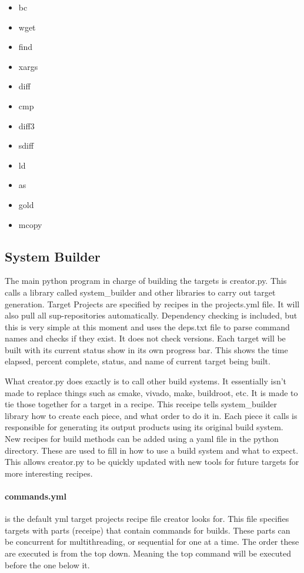 \begin{itemize}
\begin{itemize}
  \item bc
  \item wget
  \item find
  \item xargs
  \item diff
  \item cmp
  \item diff3
  \item sdiff
  \item ld
  \item as
  \item gold
  \item mcopy
  \end{itemize}
\end{itemize}

\subsection{System Builder}

\par
The main python program in charge of building the targets is creator.py. This calls a library called system\_builder and other libraries to carry out target generation.
Target Projects are specified by recipes in the projects.yml file. It will also pull all sup-repositories automatically. Dependency checking is included, but this is very simple at this moment
and uses the deps.txt file to parse command names and checks if they exist. It does not check versions. Each target will be built with its current status show in its own progress bar.
This shows the time elapsed, percent complete, status, and name of current target being built.
\par
What creator.py does exactly is to call other build systems. It essentially isn't made to replace things such as cmake, vivado, make, buildroot, etc. It is made
to tie those together for a target in a recipe. This receipe tells system\_builder library how to create each piece, and what order to do it in. Each piece it calls is responsible for
generating its output products using its original build system. New recipes for build methods can be added using a yaml file in the python directory. These are used to fill in how
to use a build system and what to expect. This allows creator.py to be quickly updated with new tools for future targets for more interesting recipes.

\paragraph{commands.yml} is the default yml target projects recipe file creator looks for. This file specifies targets with parts (receipe) that contain commands for builds.
These parts can be concurrent for multithreading, or sequential for one at a time. The order these are executed is from the top down. Meaning the
top command will be executed before the one below it.

